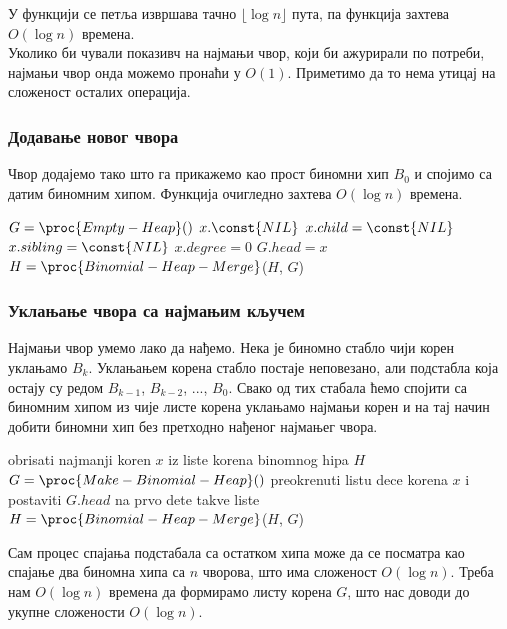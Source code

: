 \documentclass[11pt, a4paper]{article}
\theoremstyle{remark}
\numberwithin{equation}{section}
\begin{document}
	\bigbreak

	\indent У функцији  се \While петља извршава тачно $\lfloor \log n \rfloor$ пута, па функција  захтева $O(\log n)$ времена. \\
	\indent Уколико би чували показивч на најмањи чвор, који би ажурирали по потреби, најмањи чвор онда можемо пронаћи у $O(1)$. Приметимо да то нема утицај на сложеност осталих операција.

	 \subsubsection{Додавање новог чвора}
	 Чвор додајемо тако што га прикажемо као прост биномни хип $B_0$ и спојимо са датим биномним хипом. Функција  очигледно захтева $O(\log n)$ времена. 
	
	\begin{codebox}
		\li $G = \proc{Empty-Heap}()$
		\li $x.\const{NIL}$
		\li $x.child =\const{NIL}$
		\li $x.sibling=\const{NIL}$
		\li $x.degree=0$
		\li $G.head=x$
		\li $H=\proc{Binomial-Heap-Merge}$($H$, $G$)
	\end{codebox}

	\subsubsection{Уклањање чвора са најмањим кључем}
	Најмањи чвор умемо лако да нађемо. Нека је биномно стабло чији корен уклањамо $B_k$. Уклањањем корена стабло постаје неповезано, али подстабла која остају су редом $B_{k-1}$, $B_{k-2}$, ..., $B_0$. Свако од тих стабала ћемо спојити са биномним хипом из чије листе корена уклањамо најмањи корен и на тај начин добити биномни хип без претходно нађеног најмањег чвора.

	\begin{codebox}
		\Procname {\proc{Binomial-Heap-Delete-Min}($H$)}
		\li obrisati najmanji koren $x$ iz liste korena binomnog hipa $H$
		\li $G=\proc{Make-Binomial-Heap}()$
		\li preokrenuti listu dece korena $x$ i 
		\zi \Do postaviti $G.head$ na prvo dete takve liste
		\End
		\li $H=\proc{Binomial-Heap-Merge}$($H$, $G$)
    \end{codebox}

	\indent Сам процес спајања подстабала са остатком хипа може да се посматра као спајање два биномна хипа са $n$ чворова, што има сложеност $O(\log n)$. Треба нам $O(\log n)$ времена да формирамо листу корена $G$, што нас доводи до укупне сложености $O(\log n)$.
\end{document}
